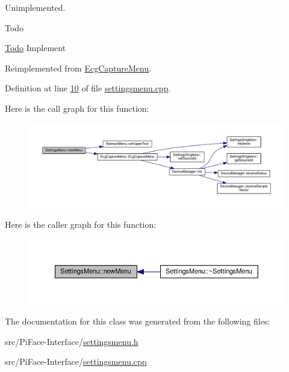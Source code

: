Unimplemented. 

\begin{DoxyRefDesc}{Todo}
\item[\hyperlink{todo__todo000022}{Todo}]Implement \end{DoxyRefDesc}


Reimplemented from \hyperlink{classEcgCaptureMenu_a610d2985e09cd56cb381e6e443dbbc72}{Ecg\+Capture\+Menu}.



Definition at line \hyperlink{settingsmenu_8cpp_source_l00010}{10} of file \hyperlink{settingsmenu_8cpp_source}{settingsmenu.\+cpp}.



Here is the call graph for this function\+:
\nopagebreak
\begin{figure}[H]
\begin{center}
\leavevmode
\includegraphics[width=350pt]{classSettingsMenu_abc441c12e8044c13f1a99791e2ee30d1_cgraph}
\end{center}
\end{figure}




Here is the caller graph for this function\+:
\nopagebreak
\begin{figure}[H]
\begin{center}
\leavevmode
\includegraphics[width=350pt]{classSettingsMenu_abc441c12e8044c13f1a99791e2ee30d1_icgraph}
\end{center}
\end{figure}




The documentation for this class was generated from the following files\+:\begin{DoxyCompactItemize}
\item 
src/\+Pi\+Face-\/\+Interface/\hyperlink{settingsmenu_8h}{settingsmenu.\+h}\item 
src/\+Pi\+Face-\/\+Interface/\hyperlink{settingsmenu_8cpp}{settingsmenu.\+cpp}\end{DoxyCompactItemize}
